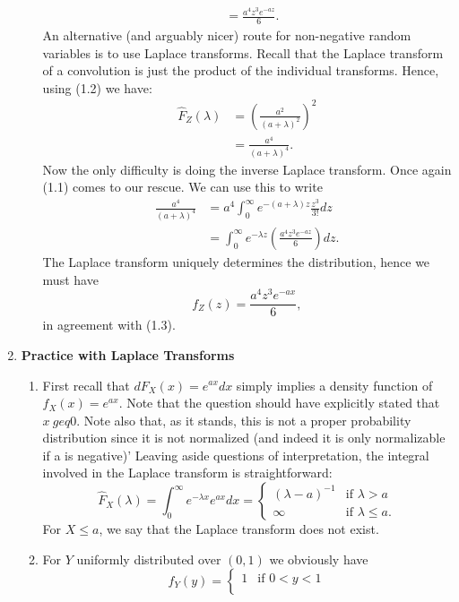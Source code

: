 \documentclass[11pt,a4paper]{article}
\begin{document}
\begin{enumerate}
\begin{enumerate}
\begin{align*}
        &= \frac{a^4z^3e^{-az}}{6}.
      \end{align*}
      An alternative (and arguably nicer) route for non-negative random variables is to use Laplace transforms. Recall that the Laplace transform of a convolution is just the product of the individual transforms. Hence, using (1.2) we have:
      \begin{align*}
        \hat{F}_Z(\lambda)
        &= \left(\frac{a^2}{(a + \lambda)^2}\right)^2\\
        &= \frac{a^4}{(a + \lambda)^4}.
      \end{align*}
      Now the only difficulty is doing the inverse Laplace transform. Once again (1.1) comes to our rescue. We can use this to write
      \begin{align*}
        \frac{a^4}{(a + \lambda)^4} 
        &= a^4\int_0^\infty e^{-(a + \lambda)z}\frac{z^3}{3!}dz\\
        &= \int_0^\infty e^{-\lambda z}\left(\frac{a^4z^3e^{-az}}{6}\right)dz.
      \end{align*}
      The Laplace transform uniquely determines the distribution, hence we must have
      $$
      f_Z(z) = \frac{a^4z^3e^{-ax}}{6},
      $$
      in agreement with (1.3).
    \end{enumerate}
    \item \textbf{Practice with Laplace Transforms}
    \begin{enumerate}
      \item First recall that $dF_X(x) = e^{ax}dx$ simply implies a density function of $f_X(x) = e^{ax}$. Note that the question should have explicitly stated that $x\ geq 0$. Note also that, as it stands, this is not a proper probability distribution since it is not normalized (and indeed it is only normalizable if a is negative)' Leaving aside questions of interpretation, the integral involved in the Laplace transform is straightforward:
      $$
      \hat{F}_X(\lambda) = \int_0^\infty e^{-\lambda x}e^{ax}dx =
      \begin{cases}
        (\lambda - a)^{-1} & \text{if $\lambda > a$}\\
        \infty & \text{if $\lambda \leq a$}.
      \end{cases}
      $$
      For $X \leq a$, we say that the Laplace transform does not exist.
      \item For $Y$ uniformly distributed over $(0, 1)$ we obviously have
      $$
      f_Y(y) =
      \begin{cases}
        1 & \text{if $0 < y < 1$}\\

\end{cases}$$
\end{enumerate}
\end{enumerate}
\end{document}
